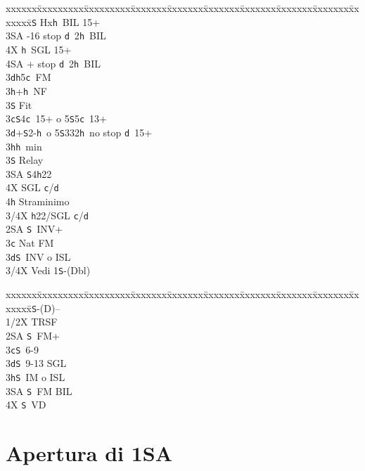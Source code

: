 \documentclass[a4paper,italian]{article}
\newcommand{\BS}{\small{\texttt{S}}}
\newcommand{\BC}{\small{\texttt{c}}}
\newcommand{\BD}{\small{\texttt{d}}}
\newcommand{\BH}{\small{\texttt{h}}}
\newenvironment{bidtable}
{\begin{tabbing}

    xxxxxx\=xxxxxxxxx\=xxxxxxxxx\=xxxxxxx\=xxxxxxx\=xxxxxxx\=xxxxxxx\=xxxxxxx\=xxxxxxx\=xxxxxxx\=\kill}
{\end{tabbing} }%
\begin{document}
\begin{multicols}{2}
\begin{bidtable}
        3\BS \> Hx\BH\ BIL 15+\\
        3\small{SA} -16 stop \BD\ 2\BH\ BIL\\
        4X \BH\ SGL 15+\\
        4\small{SA} + stop \BD\ 2\BH\ BIL\-\\
        3\BD {}\BH 5\BC\ FM\\
        3\BH {}+\BH\ NF\\
        3\BS \> Fit\-\\
        3\BC {}\BS 4\BC\ 15+ o 5\BS 5\BC\ 13+\\
        3\BD {}+\BS2-\BH\ o 5\BS 332\BH\ no stop \BD\ 15+\\
        3\BH {}\BH\ min\+\\
        3\BS \> Relay\+\\
        3\small{SA} \BS 4\BH 22\\
        4X \> SGL \BC /\BD \\
        4\BH \> Straminimo\-\-\\
        3/4X \BH 22/SGL \BC /\BD \-\\
        2\small{SA} \BS\ INV+\\
        3\BC\> Nat FM\\
        3\BD{}\BS\ INV o ISL\\
        3/4X \> Vedi 1\BS -(Dbl)\-
    \end{bidtable}
    \columnbreak
    \begin{bidtable}
        1\BS-(D)--\+\\
        1/2X \> TRSF\\
        2\small{SA} \BS\ FM+\\
        3\BC {}\BS\ 6-9\\
        3\BD {}\BS\ 9-13 SGL\\
        3\BH {}\BS\ IM o ISL\\
        3\small{SA} \BS\ FM BIL\\
        4X \BS\ VD\-
    \end{bidtable}
    \vfill\null
\end{multicols}

\newpage

\section{Apertura di 1\small{SA}}
\end{document}
